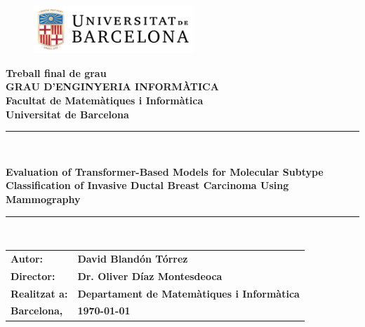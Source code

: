 \documentclass[a4paper,10pt]{book}
\begin{document}
\pagestyle{empty}

\begin{titlepage}
	\begin{center}
		\begin{figure}[htb]
			\begin{center}
				\includegraphics[width=6cm]{assets/ub_color.pdf}
			\end{center}
		\end{figure}
				
		\def\worktitle{Evaluation of Transformer-Based Models for Molecular Subtype Classification of Invasive Ductal Breast Carcinoma Using Mammography}
				
		\textbf{\LARGE Treball final de grau} \\
		\vspace*{.5cm}
		\textbf{\LARGE GRAU D'ENGINYERIA INFORM\`{A}TICA } \\
		\vspace*{.5cm}
		\textbf{\LARGE Facultat de Matem\`atiques i Inform\`atica\\ Universitat de Barcelona} \\
		\vspace*{1.0cm}
		\rule{16cm}{0.1mm}\\
		\begin{Huge}
			\textbf{Evaluation of Transformer-Based Models for Molecular Subtype Classification of Invasive Ductal Breast Carcinoma Using Mammography} \\
		\end{Huge}
		\rule{16cm}{0.1mm}\\
				
		\vspace{1cm}
				
		\begin{flushright}
						
						
			\vspace*{2.5cm}
						
			\hfill
						
			\renewcommand{\arraystretch}{1.5}
			\begin{tabular}{ll}
				\textbf{\small Autor:}       & \textbf{\small David Bland\'on T\'orrez }                             \\
				\textbf{\small Director:}    & \textbf{\small Dr. Oliver D\'iaz Montesdeoca }                        \\
				\textbf{\small Realitzat a:} & \textbf{\small  Departament de Matem\`{a}tiques i  Inform\`{a}tica  } \\
				\textbf{\small Barcelona,}   & \textbf{\small \today }                                               
			\end{tabular}
						
		\end{flushright}
				
	\end{center}
		
\end{titlepage}
\end{document}
